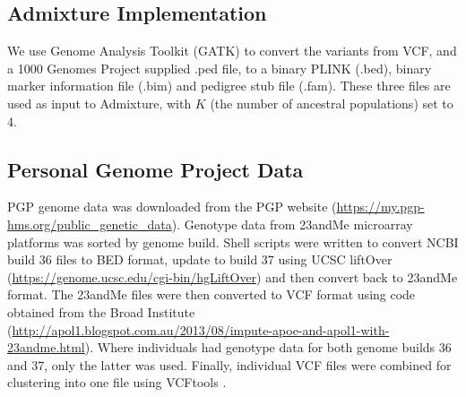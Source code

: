 \documentclass{bmcart}
\begin{document}
\subsection*{{\sc Admixture} Implementation}
We use Genome Analysis Toolkit (GATK) to convert the variants from VCF, and a 1000 Genomes Project supplied .ped file, to a binary PLINK (.bed), binary marker information file (.bim) and pedigree stub file (.fam).
These three files are used as input to {\sc Admixture}, with $K$ (the number of ancestral populations) set to 4.

\subsection*{Personal Genome Project Data}
PGP genome data was downloaded from the PGP website (\url{https://my.pgp-hms.org/public_genetic_data}). Genotype data from 23andMe microarray platforms was sorted by genome 
build. Shell scripts were written to convert NCBI build 36 files to BED format, update to build 37 using UCSC liftOver (\url{https://genome.ucsc.edu/cgi-bin/hgLiftOver}) and 
then convert back to 23andMe format. The 23andMe files were then converted to VCF format using code obtained from the Broad Institute (\url{http://apol1.blogspot.com.au/2013/08/impute-apoe-and-apol1-with-23andme.html}). 
Where individuals had genotype data for both genome builds 36 and 37, only the latter was used. Finally, individual VCF files were combined for clustering into one 
file using VCFtools \cite{Danecek2011Variant}.


\end{document}
